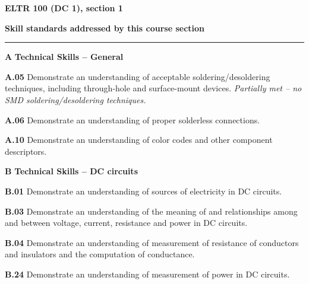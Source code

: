 \vskip 10pt




\vfil \eject

\centerline{\bf ELTR 100 (DC 1), section 1} \bigskip 
 
\vskip 10pt

\noindent
{\bf Skill standards addressed by this course section}

\vskip 5pt

\hrule \vskip 10pt
\noindent
{}

\vskip 5pt

\medskip
\item{\bf A} {\bf Technical Skills -- General}
\item{\bf A.05} Demonstrate an understanding of acceptable soldering/desoldering techniques, including through-hole and surface-mount devices.  {\it Partially met -- no SMD soldering/desoldering techniques.}
\item{\bf A.06} Demonstrate an understanding of proper solderless connections.
\item{\bf A.10} Demonstrate an understanding of color codes and other component descriptors.
\item{\bf B} {\bf Technical Skills -- DC circuits}
\item{\bf B.01} Demonstrate an understanding of sources of electricity in DC circuits.
\item{\bf B.03} Demonstrate an understanding of the meaning of and relationships among and between voltage, current, resistance and power in DC circuits.
\item{\bf B.04} Demonstrate an understanding of measurement of resistance of conductors and insulators and the computation of conductance. 
\item{\bf B.24} Demonstrate an understanding of measurement of power in DC circuits.
\medskip

\vskip 5pt

